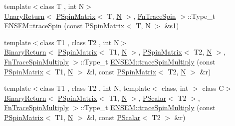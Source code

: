 \begin{DoxyCompactItemize}
\item 
{\footnotesize template$<$class T , int N$>$ }\\\mbox{\hyperlink{structENSEM_1_1UnaryReturn}{Unary\+Return}}$<$ \mbox{\hyperlink{classENSEM_1_1PSpinMatrix}{P\+Spin\+Matrix}}$<$ T, \mbox{\hyperlink{operator__name__util_8cc_a7722c8ecbb62d99aee7ce68b1752f337}{N}} $>$, \mbox{\hyperlink{structENSEM_1_1FnTraceSpin}{Fn\+Trace\+Spin}} $>$\+::Type\+\_\+t \mbox{\hyperlink{group__primspinmatrix_gaf2ad1f1c91e0de897096d4164e090641}{E\+N\+S\+E\+M\+::trace\+Spin}} (const \mbox{\hyperlink{classENSEM_1_1PSpinMatrix}{P\+Spin\+Matrix}}$<$ T, \mbox{\hyperlink{operator__name__util_8cc_a7722c8ecbb62d99aee7ce68b1752f337}{N}} $>$ \&s1)
\item 
{\footnotesize template$<$class T1 , class T2 , int N$>$ }\\\mbox{\hyperlink{structENSEM_1_1BinaryReturn}{Binary\+Return}}$<$ \mbox{\hyperlink{classENSEM_1_1PSpinMatrix}{P\+Spin\+Matrix}}$<$ T1, \mbox{\hyperlink{operator__name__util_8cc_a7722c8ecbb62d99aee7ce68b1752f337}{N}} $>$, \mbox{\hyperlink{classENSEM_1_1PSpinMatrix}{P\+Spin\+Matrix}}$<$ T2, \mbox{\hyperlink{operator__name__util_8cc_a7722c8ecbb62d99aee7ce68b1752f337}{N}} $>$, \mbox{\hyperlink{structENSEM_1_1FnTraceSpinMultiply}{Fn\+Trace\+Spin\+Multiply}} $>$\+::Type\+\_\+t \mbox{\hyperlink{group__primspinmatrix_gab5c053ea22b374090822742e46ebd402}{E\+N\+S\+E\+M\+::trace\+Spin\+Multiply}} (const \mbox{\hyperlink{classENSEM_1_1PSpinMatrix}{P\+Spin\+Matrix}}$<$ T1, \mbox{\hyperlink{operator__name__util_8cc_a7722c8ecbb62d99aee7ce68b1752f337}{N}} $>$ \&l, const \mbox{\hyperlink{classENSEM_1_1PSpinMatrix}{P\+Spin\+Matrix}}$<$ T2, \mbox{\hyperlink{operator__name__util_8cc_a7722c8ecbb62d99aee7ce68b1752f337}{N}} $>$ \&r)
\item 
{\footnotesize template$<$class T1 , class T2 , int N, template$<$ class, int $>$ class C$>$ }\\\mbox{\hyperlink{structENSEM_1_1BinaryReturn}{Binary\+Return}}$<$ \mbox{\hyperlink{classENSEM_1_1PSpinMatrix}{P\+Spin\+Matrix}}$<$ T1, \mbox{\hyperlink{operator__name__util_8cc_a7722c8ecbb62d99aee7ce68b1752f337}{N}} $>$, \mbox{\hyperlink{classENSEM_1_1PScalar}{P\+Scalar}}$<$ T2 $>$, \mbox{\hyperlink{structENSEM_1_1FnTraceSpinMultiply}{Fn\+Trace\+Spin\+Multiply}} $>$\+::Type\+\_\+t \mbox{\hyperlink{group__primspinmatrix_ga397616dd6ad517f1cf893903cd93c2c8}{E\+N\+S\+E\+M\+::trace\+Spin\+Multiply}} (const \mbox{\hyperlink{classENSEM_1_1PSpinMatrix}{P\+Spin\+Matrix}}$<$ T1, \mbox{\hyperlink{operator__name__util_8cc_a7722c8ecbb62d99aee7ce68b1752f337}{N}} $>$ \&l, const \mbox{\hyperlink{classENSEM_1_1PScalar}{P\+Scalar}}$<$ T2 $>$ \&r)

\end{DoxyCompactItemize}
